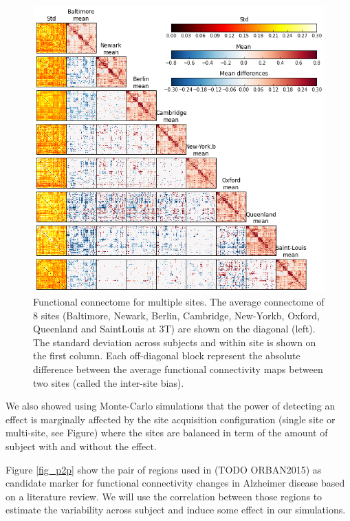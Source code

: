 \documentclass[authoryear]{elsarticle}
\begin{document}
\begin{figure}[H!]
\begin{center}
\includegraphics[width=\linewidth]{../figures/connectome_multisite.png}
\end{center}
\caption[Connectome variability across sites]{
Functional connectome for multiple sites. The average connectome of 8 sites (Baltimore, Newark, Berlin, Cambridge, New-Yorkb, Oxford, Queenland and SaintLouis at 3T) are shown on the diagonal (left). The standard deviation across subjects and within site is shown on the first column. Each off-diagonal block represent the absolute difference between the average functional connectivity maps between two sites (called the inter-site bias).
}
\label{fig_connectome_variability}
\end{figure}


We also showed using Monte-Carlo simulations that the power of detecting an effect is marginally affected by the site acquisition configuration (single site or multi-site, see Figure) where the sites are balanced in term of the amount of subject with and without the effect. 


Figure \ref{fig_p2p} show the pair of regions used in (TODO ORBAN2015) as candidate marker for functional connectivity changes in Alzheimer disease based on a literature review. We will use the correlation between those regions to estimate the variability across subject and induce some effect in our simulations.
\end{document}
